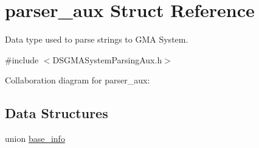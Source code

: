 \hypertarget{structparser__aux}{
\section{parser\_\-aux Struct Reference}
\label{structparser__aux}
}


Data type used to parse strings to GMA System.  




{\ttfamily \#include $<$DSGMASystemParsingAux.h$>$}



Collaboration diagram for parser\_\-aux:\subsection*{Data Structures}
\begin{DoxyCompactItemize}
\item 
union \hyperlink{unionparser__aux_1_1base__info}{base\_\-info}
\end{DoxyCompactItemize}
